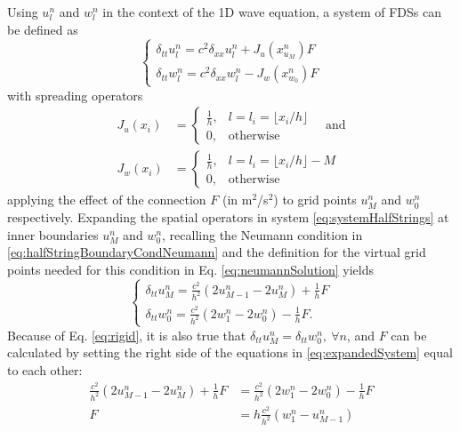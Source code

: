 Using $u_l^n$ and $w_l^n$ in the context of the 1D wave equation, a system of FDSs can be defined as
\begin{equation}
    \begin{cases}\label{eq:systemHalfStrings}
        \delta_{tt}u_l^n = c^2\delta_{xx}u_l^n + J_u(x_{u_M}^n)F\\
        \delta_{tt}w_l^n = c^2\delta_{xx}w_l^n - J_w(x_{w_0}^n)F
    \end{cases}
\end{equation}
with spreading operators
\begin{equation}
    \begin{aligned}
    J_u(x_i)& =
    \begin{cases}
        \frac{1}{h}, & l = l_i = \lfloor x_i/h\rfloor\\
        0,& \text{otherwise}
    \end{cases}
    \quad\text{and}\\
    J_w(x_i) &=
    \begin{cases}
        \frac{1}{h}, & l = l_i = \lfloor x_i/h \rfloor - M\\
        0,& \text{otherwise}
    \end{cases}
\end{aligned}
\end{equation}
applying the effect of the connection %
$F$ (in m$^2$/s$^2$) to grid points $u_M^n$ and $w_0^n$ respectively.
%
Expanding the spatial operators in system \eqref{eq:systemHalfStrings} at inner boundaries $u_M^n$ and $w_0^n$, recalling the Neumann condition in  \eqref{eq:halfStringBoundaryCondNeumann} and the definition for the virtual grid points needed for this condition in Eq. \eqref{eq:neumannSolution} yields
\begin{equation}\label{eq:expandedSystem}
    \begin{cases}
        \delta_{tt}u_M^n = \frac{c^2}{h^2}(2u_{M-1}^n-2u_M^n) + \frac{1}{h}F\\
        \delta_{tt}w_0^n = \frac{c^2}{h^2}(2w_1^n-2w_0^n) - \frac{1}{h}F.
    \end{cases}
\end{equation}
Because of Eq. \eqref{eq:rigid}, it is also true that $\delta_{tt}u_M^n = \delta_{tt}w_0^n, \ \forall n$, and $F$ can be calculated by setting the right side of the equations in \eqref{eq:expandedSystem} equal to each other:
\begin{align*}
     \frac{c^2}{h^2}(2u_{M-1}^n-2u_M^n) + \frac{1}{h} F&= 
     \frac{c^2}{h^2}(2w_1^n-2w_0^n) - \frac{1}{h} F\nonumber\\
    F &= h \frac{c^2}{h^2}(w_1^n - u_{M-1}^n)
\end{align*}
